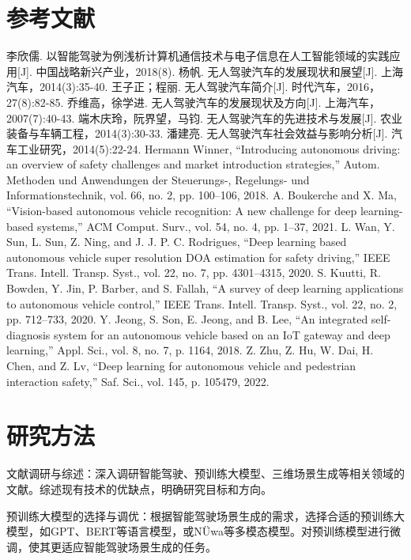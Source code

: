 \documentclass{article}
\begin{document}
\section{参考文献}
\begin{thebibliography}{99}
     李欣儒. 以智能驾驶为例浅析计算机通信技术与电子信息在人工智能领域的实践应用[J]. 中国战略新兴产业，2018(8).
     杨帆. 无人驾驶汽车的发展现状和展望[J]. 上海汽车，2014(3):35-40.
     王子正；程丽. 无人驾驶汽车简介[J]. 时代汽车，2016，27(8):82-85.
     乔维高，徐学进. 无人驾驶汽车的发展现状及方向[J]. 上海汽车，2007(7):40-43.
     端木庆玲，阮界望，马钧. 无人驾驶汽车的先进技术与发展[J]. 农业装备与车辆工程，2014(3):30-33.
     潘建亮. 无人驾驶汽车社会效益与影响分析[J]. 汽车工业研究，2014(5):22-24.
     Hermann Winner, “Introducing autonomous driving: an overview of safety challenges and market introduction strategies,” Autom. Methoden und Anwendungen der Steuerungs-, Regelungs- und Informationstechnik, vol. 66, no. 2, pp. 100–106, 2018.
     A. Boukerche and X. Ma, “Vision-based autonomous vehicle recognition: A new challenge for deep learning-based systems,” ACM Comput. Surv., vol. 54, no. 4, pp. 1–37, 2021.
     L. Wan, Y. Sun, L. Sun, Z. Ning, and J. J. P. C. Rodrigues, “Deep learning based autonomous vehicle super resolution DOA estimation for safety driving,” IEEE Trans. Intell. Transp. Syst., vol. 22, no. 7, pp. 4301–4315, 2020.
     S. Kuutti, R. Bowden, Y. Jin, P. Barber, and S. Fallah, “A survey of deep learning applications to autonomous vehicle control,” IEEE Trans. Intell. Transp. Syst., vol. 22, no. 2, pp. 712–733, 2020.
     Y. Jeong, S. Son, E. Jeong, and B. Lee, “An integrated self-diagnosis system for an autonomous vehicle based on an IoT gateway and deep learning,” Appl. Sci., vol. 8, no. 7, p. 1164, 2018.
     Z. Zhu, Z. Hu, W. Dai, H. Chen, and Z. Lv, “Deep learning for autonomous vehicle and pedestrian interaction safety,” Saf. Sci., vol. 145, p. 105479, 2022.
\end{thebibliography}
\section{研究方法}
文献调研与综述：深入调研智能驾驶、预训练大模型、三维场景生成等相关领域的文献。综述现有技术的优缺点，明确研究目标和方向。

预训练大模型的选择与调优：根据智能驾驶场景生成的需求，选择合适的预训练大模型，如GPT、BERT等语言模型，或NÜwa等多模态模型。对预训练模型进行微调，使其更适应智能驾驶场景生成的任务。
\end{document}
